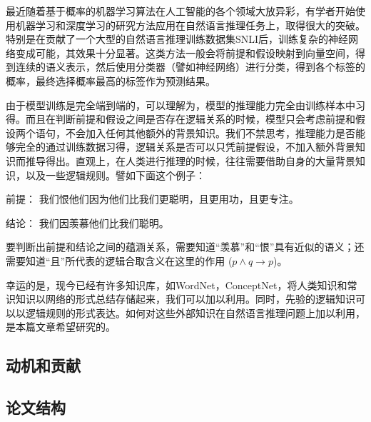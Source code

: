 \documentclass[UTF8,11pt,a4paper,nofonts]{ctexart}
\begin{document}
最近随着基于概率的机器学习算法在人工智能的各个领域大放异彩，有学者开始使用机器学习和深度学习的研究方法应用在自然语言推理任务上，取得很大的突破。特别是在\cite{}贡献了一个大型的自然语言推理训练数据集SNLI后，训练复杂的神经网络变成可能，其效果十分显著。这类方法一般会将前提和假设映射到向量空间，得到连续的语义表示，然后使用分类器（譬如神经网络）进行分类，得到各个标签的概率，最终选择概率最高的标签作为预测结果。

由于模型训练是完全端到端的，可以理解为，模型的推理能力完全由训练样本中习得。而且在判断前提和假设之间是否存在逻辑关系的时候，模型只会考虑前提和假设两个语句，不会加入任何其他额外的背景知识。我们不禁思考，推理能力是否能够完全的通过训练数据习得，逻辑关系是否可以只凭前提假设，不加入额外背景知识而推导得出。直观上，在人类进行推理的时候，往往需要借助自身的大量背景知识，以及一些逻辑规则。譬如下面这个例子：


前提： 我们恨他们因为他们比我们更聪明，且更用功，且更专注。

结论： 我们因羡慕他们比我们聪明。

要判断出前提和结论之间的蕴涵关系，需要知道“羡慕”和“恨”具有近似的语义；还需要知道“且”所代表的逻辑合取含义在这里的作用
($p \land q \to p$)。

幸运的是，现今已经有许多知识库，如WordNet，ConceptNet，将人类知识和常识知识以网络的形式总结存储起来，我们可以加以利用。同时，先验的逻辑知识可以以逻辑规则的形式表达。如何对这些外部知识在自然语言推理问题上加以利用，是本篇文章希望研究的。





\subsection{动机和贡献}






\subsection{论文结构}

\end{document}
